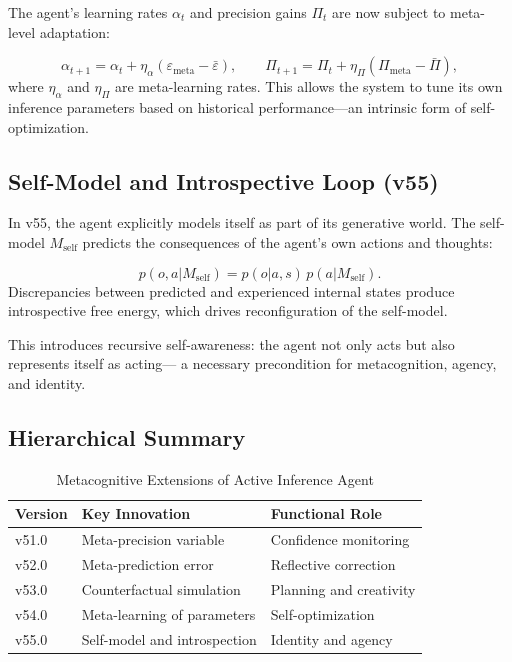\documentclass[9pt]{elife}
\begin{document}
The agent’s learning rates $\alpha_t$ and precision gains $\Pi_t$
are now subject to meta-level adaptation:

\[
\alpha_{t+1} = \alpha_t + \eta_\alpha (\varepsilon_{\mathrm{meta}} - \bar{\varepsilon}),
\qquad
\Pi_{t+1} = \Pi_t + \eta_\Pi (\Pi_{\mathrm{meta}} - \bar{\Pi}),
\]
where $\eta_\alpha$ and $\eta_\Pi$ are meta-learning rates.
This allows the system to tune its own inference parameters
based on historical performance—an intrinsic form of self-optimization.

\subsection{Self-Model and Introspective Loop (v55)}

In v55, the agent explicitly models itself as part of its generative world.
The self-model $M_{\mathrm{self}}$ predicts the consequences
of the agent’s own actions and thoughts:

\[
p(o, a | M_{\mathrm{self}}) = p(o|a, s) \, p(a|M_{\mathrm{self}}).
\]
Discrepancies between predicted and experienced internal states
produce introspective free energy,
which drives reconfiguration of the self-model.

This introduces recursive self-awareness:
the agent not only acts but also represents itself as acting—
a necessary precondition for metacognition, agency, and identity.

\subsection{Hierarchical Summary}

\begin{table}[h]
\centering
\caption{Metacognitive Extensions of Active Inference Agent}
\begin{tabular}{l l l}
\hline
Version & Key Innovation & Functional Role \\
\hline
v51.0 & Meta-precision variable & Confidence monitoring \\
v52.0 & Meta-prediction error & Reflective correction \\
v53.0 & Counterfactual simulation & Planning and creativity \\
v54.0 & Meta-learning of parameters & Self-optimization \\
v55.0 & Self-model and introspection & Identity and agency \\
\hline
\end{tabular}
\end{table}
\end{document}
